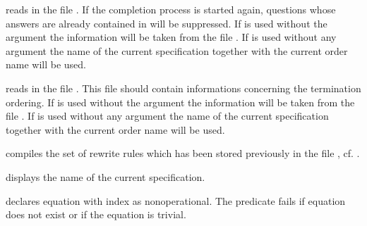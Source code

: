 \begin{command}
reads in the file . 
If the completion process is started again, %
questions whose answers are already contained in 
will be suppressed. 
If  is used without the argument  the 
information will be taken from the file .
If  is used without any argument
the name of the current specification together with the current order name
will be used.
\end{command}

\begin{command}
reads in the file . 
This file should contain informations concerning the termination ordering.
If  is used without the argument  the 
information will be taken from the file .
If  is used without any argument
the name of the current specification together with the current order name
will be used.
\end{command}

\begin{command}
compiles the set of rewrite rules which has been stored previously in the file
, cf. .
\end{command}

\begin{command}
displays the name of the current specification.
\end{command}


\begin{command}
declares equation with index  as nonoperational. 
The predicate fails if equation  does not exist 
or if the equation is trivial.
\end{command}

